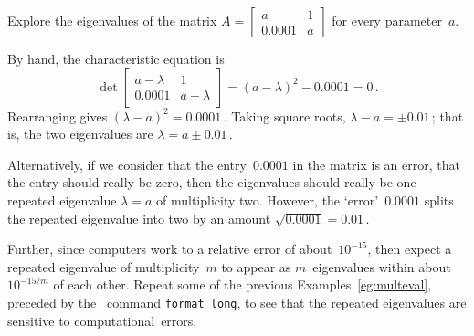 \begin{example} \label{eg:}
Explore the eigenvalues of the matrix
\(A=\begin{bmatrix} a&1\\0.0001&a \end{bmatrix}\) for every parameter~\(a\).
\begin{solution} 
By hand, the characteristic equation is
\begin{equation*}
\det\begin{bmatrix} a-\lambda&1\\0.0001&a-\lambda \end{bmatrix}
=(a-\lambda)^2-0.0001=0\,.
\end{equation*}
Rearranging gives \((\lambda-a)^2=0.0001\)\,.
Taking square roots, \(\lambda-a=\pm0.01\)\,; that is, the two eigenvalues are \(\lambda=a\pm0.01\)\,.

Alternatively, if we consider that the entry~\(0.0001\) in the matrix is an error, that the entry should really be zero, then the eigenvalues should really be one repeated eigenvalue \(\lambda=a\) of multiplicity two.
However, the `error'~\(0.0001\) splits the repeated eigenvalue into two by an amount \(\sqrt{0.0001}=0.01\)\,.
\end{solution}
\end{example}


Further, since computers work to a relative error of about~\(10^{-15}\), then expect a repeated eigenvalue of multiplicity~\(m\) to appear as \(m\)~eigenvalues within about~\(10^{-15/m}\) of each other.
Repeat some of the previous Examples~\ref{eg:multeval}, preceded by the \script\ command \verb|format long|, to see that the repeated eigenvalues are sensitive to  computational~errors.



